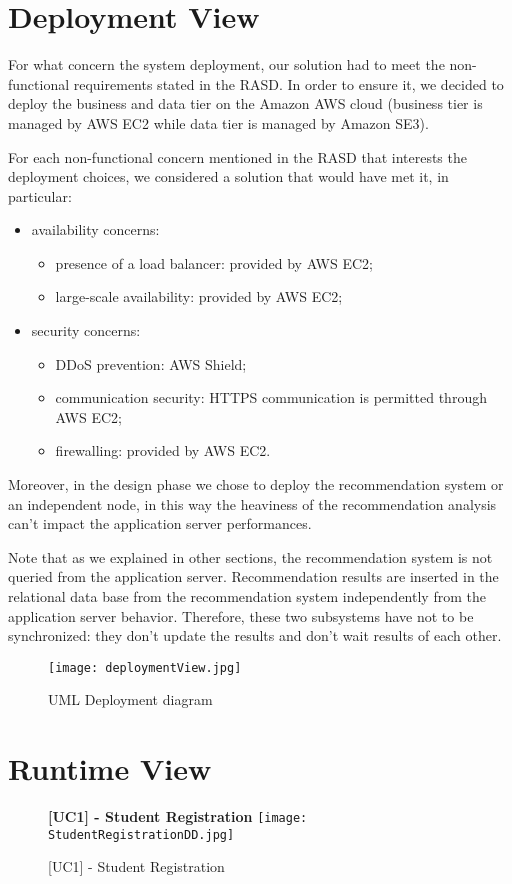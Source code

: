	\section{Deployment View}
		For what concern the system deployment, our solution had to meet the non-functional requirements stated in the RASD. In order to ensure it, we decided to deploy the business and data tier on the Amazon AWS cloud (business tier is managed by AWS EC2 while data tier is managed by Amazon SE3).
		
		For each non-functional concern mentioned in the RASD that interests the deployment choices, we considered a solution that would have met it, in particular:
		\begin{itemize}
			\item availability concerns:
				\begin{itemize}
					\item presence of a load balancer: provided by AWS EC2;
					\item large-scale availability: provided by AWS EC2;
				\end{itemize}
			\item security concerns:
				\begin{itemize}
					\item DDoS prevention: AWS Shield;
					\item communication security: HTTPS communication is permitted through AWS EC2;
					\item firewalling: provided by AWS EC2.
				\end{itemize}
		\end{itemize}
		Moreover, in the design phase we chose to deploy the recommendation system or an independent node, in this way the heaviness of the recommendation analysis can't impact the application server performances.
		
		Note that as we explained in other sections, the recommendation system is not queried from the application server. Recommendation results are inserted in the relational data base from the recommendation system independently from the application server behavior. Therefore, these two subsystems have not to be synchronized: they don't update the results and don't wait results of each other.
		
		\begin{figure}[H]
			\centering
			\caption{UML Deployment diagram}
			\texttt{[image: deploymentView.jpg]}
		\end{figure}
	\section{Runtime View}
		\begin{figure}[H]
			\centering
			{\bfseries [UC1] - Student Registration}
			\texttt{[image: StudentRegistrationDD.jpg]}
			\caption{[UC1] - Student Registration}
		\end{figure}
		
